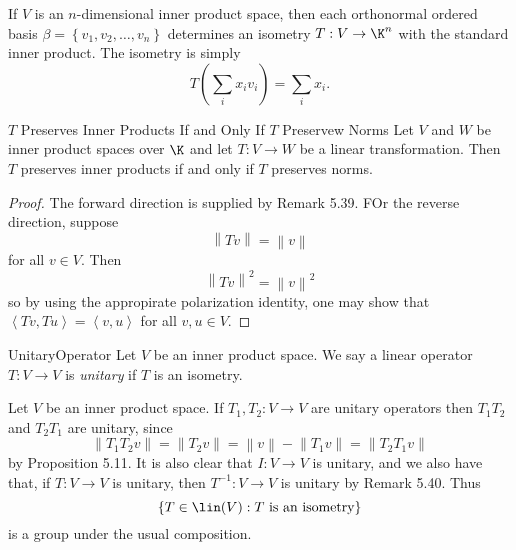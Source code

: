 \documentclass[linearalgebraII]{subfiles}
\begin{document}
    \begin{example}
        If $V$ is an $n$-dimensional inner product space, then each orthonormal ordered basis $\beta = \left\lbrace v_1,v_2,\ldots,v_n \right\rbrace$ determines an isometry $T:V\to\K^n$ with the standard inner product. The isometry is simply
        \begin{equation*}
            T\left( \sum^{}_{i} x_iv_i \right) = \sum^{}_{i} x_i.
        \end{equation*}
    \end{example}

    \begin{prop}{$T$ Preserves Inner Products If and Only If $T$ Preservew Norms}
        Let $V$ and $W$ be inner product spaces over $\K$ and let $T:V\to W$ be a linear transformation. Then $T$ preserves inner products if and only if $T$ preserves norms.
    \end{prop}

    \begin{proof}
        The forward direction is supplied by Remark 5.39. FOr the reverse direction, suppose
        \begin{equation*}
            \left\lVert Tv\right\rVert = \left\lVert v\right\rVert 
        \end{equation*}
        for all $v\in V$. Then
        \begin{equation*}
            \left\lVert Tv\right\rVert ^2 = \left\lVert v\right\rVert ^2
        \end{equation*}
        so by using the appropirate polarization identity, one may show that $\left\langle Tv, Tu\right\rangle = \left\langle v, u\right\rangle $ for all $v,u\in V$.
    \end{proof}

    \begin{definition}{Unitary}{Operator}
        Let $V$ be an inner product space. We say a linear operator $T:V\to V$ is \emph{unitary} if $T$ is an isometry.
    \end{definition}

    \begin{remark}
        Let $V$ be an inner product space. If $T_1,T_2:V\to V$ are unitary operators then $T_1T_2$ and $T_2T_1$ are unitary, since
        \begin{equation*}
            \left\lVert T_1T_2v\right\rVert = \left\lVert T_2v\right\rVert = \left\lVert v\right\rVert - \left\lVert T_1v\right\rVert = \left\lVert T_2T_1v\right\rVert 
        \end{equation*}
        by Proposition 5.11. It is also clear that $I:V\to V$ is unitary, and we also have that, if $T:V\to V$ is unitary, then $T^{-1}:V\to V$ is unitary by Remark 5.40. Thus
        \begin{equation*}
            \left\lbrace T\in\lin(V) : T\text{ is an isometry} \right\rbrace 
        \end{equation*}
        is a group under the usual composition.
    \end{remark}
\end{document}
